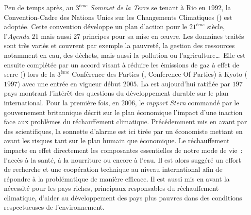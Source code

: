 Peu de temps après, au $3^{ème}$ \textit{Sommet de la Terre} se tenant à Rio en $1992$, la
Convention-Cadre des Nations Unies sur les Changements Climatiques
()
est adoptée. Cette convention développe un plan d’action pour le $21^{ème}$ siècle,
l’\textit{Agenda $21$} mais aussi $27$ principes pour sa mise en œuvre. Les domaines
traités sont très variés et couvrent par exemple la pauvreté, la gestion des ressources
notamment en eau, des déchets, mais aussi la pollution ou l’agriculture\dots\  Elle est
ensuite complétée par un accord visant à réduire les émissions de gaz à effet de serre
() lors de la $3^{ème}$ Conférence des Parties (, Conference Of Parties) à
Kyoto ($1997$) avec une entrée en vigueur début $2005$. La  est aujourd’hui
ratifiée par $197$ pays montrant l’intérêt des questions du développement durable sur le
plan international. Pour la première fois, en $2006$, le \textit{rapport Stern}
\parencite{Stern2006} commandé par le gouvernement britannique décrit sur le plan
économique l’impact d’une inaction face aux problèmes du réchauffement climatique.
Précédemment mis en avant par des scientifiques, la sonnette d’alarme est ici tirée par un
économiste mettant en avant les risques tant sur le plan humain que économique. Le
réchauffement impacte en effet directement les composantes essentielles de notre mode de
vie~: l’accès à la santé, à la nourriture ou encore à l’eau. Il est alors suggéré un effort
de recherche et une coopération technique au niveau international afin de répondre à la
problématique de manière efficace. Il est aussi mis en avant la nécessité pour les pays
riches, principaux responsables du réchauffement climatique, d’aider au développement des
pays plus pauvres dans des conditions respectueuses de l’environnement.

